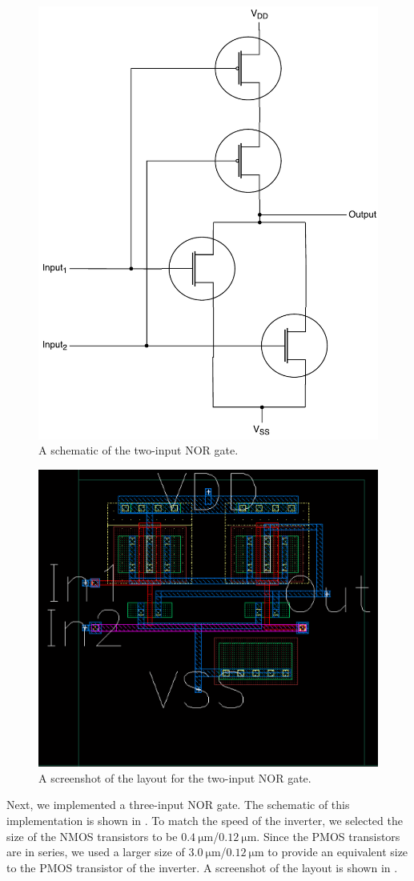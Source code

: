 \documentclass[journal,hidelinks]{IEEEtran}
\begin{document}
\begin{figure}[!htb]
  \centering
  \includegraphics[height=0.7\columnwidth]{diagrams/nor_gate.pdf}
  \caption{A schematic of the two-input NOR gate.}
  \label{fig:nor_gate}
\end{figure}

\begin{figure}[!htb]
  \centering
  \includegraphics[width=0.8\columnwidth]{layout/nor_gate.png}
  \caption{A screenshot of the layout for the two-input NOR gate.}
  \label{fig:nor_gate_layout}
\end{figure}

Next, we implemented a three-input NOR gate. The schematic of this implementation is shown in . To match the speed of the inverter, we selected the size of the NMOS transistors to be $\SI{0.4}{\micro\meter}$/$\SI{0.12}{\micro\meter}$. Since the PMOS transistors are in series, we used a larger size of $\SI{3.0}{\micro\meter}$/$\SI{0.12}{\micro\meter}$ to provide an equivalent size to the PMOS transistor of the inverter. A screenshot of the layout is shown in .
\end{document}
